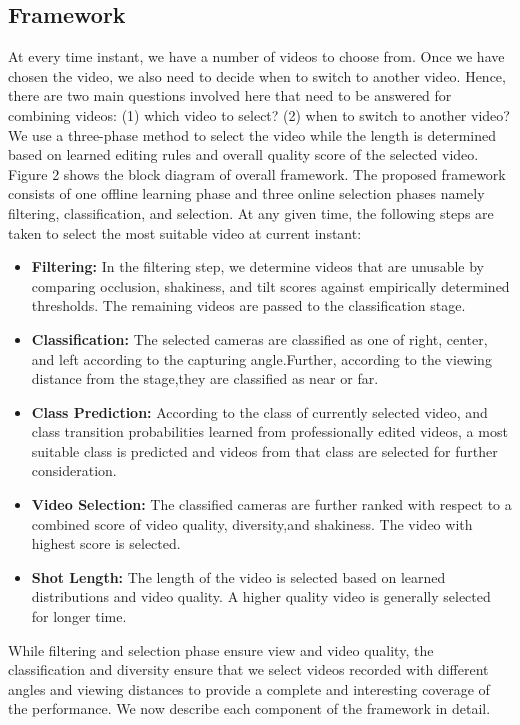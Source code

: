 \documentclass{IEEEtran}
\begin{document}
\subsection{Framework}
At every time instant, we have a number of videos to choose from. Once we have chosen the video, we also need to decide when to switch to another video. Hence, there are two main questions involved here that need to be answered for combining videos: (1) which video to select? (2) when to switch to another video? We use a three-phase method to select the video while the length is determined based on learned editing rules and overall quality score
of the selected video. Figure 2 shows the block diagram of overall framework. The
proposed framework consists of one offline learning phase and three online selection phases namely filtering, classification, and selection. At any given time, the following steps are taken to select the most suitable video at current instant:
\begin{itemize}
    \item \textbf{Filtering: }In the filtering step, we determine videos that are unusable by comparing occlusion, shakiness, and tilt scores against empirically determined thresholds. The remaining videos are passed to the classification stage.
    \item \textbf{Classification: }The selected cameras are classified as one of right, center, and left according to the capturing angle.Further, according to the viewing distance from the stage,they are classified as near or far.
    \item \textbf{Class Prediction: }According to the class of currently selected video, and class transition probabilities learned from professionally edited videos, a most suitable class is predicted and videos from that class are selected for further consideration.
    \item \textbf{Video Selection: }The classified cameras are further ranked with respect to a combined score of video quality, diversity,and shakiness. The video with highest score is selected.
    \item \textbf{Shot Length: }The length of the video is selected based on learned distributions and video quality. A higher quality video is generally selected for longer time.
\end{itemize}
While filtering and selection phase ensure view and video quality, the classification and diversity ensure that we select videos recorded with different angles and viewing distances to provide a complete and interesting coverage of the performance. We now describe each component of the framework in detail.
\end{document}
